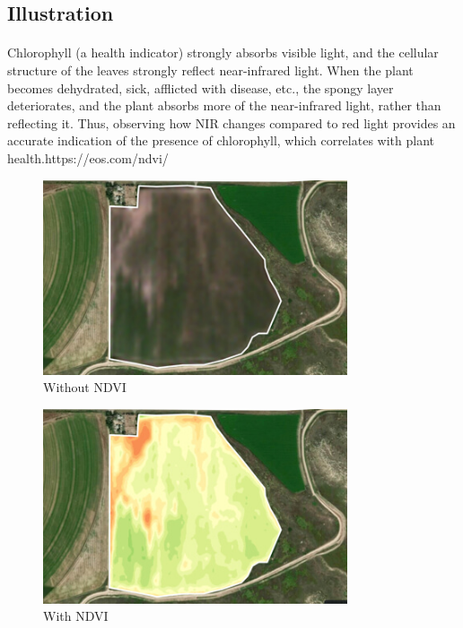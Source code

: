 \documentclass[12pt, a4paper]{report}
\begin{document}
\subsection{Illustration}
\paragraph{}
Chlorophyll (a health indicator) strongly absorbs visible light, and the cellular structure of the leaves strongly reflect near-infrared light. When the plant becomes dehydrated, sick, afflicted with disease, etc., the spongy layer deteriorates, and the plant absorbs more of the near-infrared light, rather than reflecting it. Thus, observing how NIR changes compared to red light provides an accurate indication of the presence of chlorophyll, which correlates with plant health.https://eos.com/ndvi/
\begin{figure}[h]
\centering
\includegraphics[width=0.8\textwidth]{ndvisampleone.jpg}
\caption{Without NDVI}
\end{figure}
\begin{figure}[h]
\centering
\includegraphics[width=0.8\textwidth]{ndvisampletwo.jpg}
\caption{With NDVI}
\end{figure}
\newpage
\end{document}
